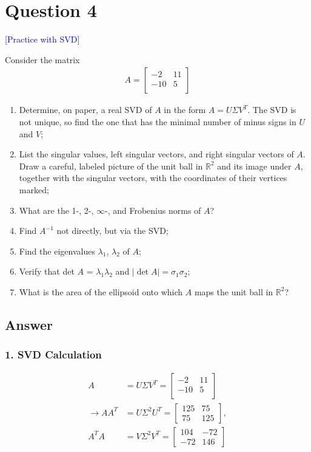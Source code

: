 \section*{Question 4}
\textcolor{blue}{[Practice with SVD]}


Consider the matrix
\begin{align*}
A = \begin{bmatrix}
-2 & 11\\
-10 & 5\\
\end{bmatrix}    
\end{align*}


\begin{enumerate}
    \item Determine, on paper, a real SVD of $A$ in the form $A = U \Sigma V^T$. The SVD is not unique, so find the one that has the minimal number of minus signs in $U$ and $V$;
    \item List the singular values, left singular vectors, and right singular vectors of $A$. 
    Draw a careful, labeled picture of the unit ball in $\mathbb{R}^2$ and its image under $A$, 
    together with the singular vectors, 
    with the coordinates of their vertices marked;
    \item What are the 1-, 2-, $\infty$-, and Frobenius norms of $A$?
    \item Find $A^{-1}$ not directly, but via the SVD;
    \item Find the eigenvalues $\lambda_1$,  $\lambda_2$ of $A$;
    \item Verify that det $A$ = $\lambda_1\lambda_2$ and $|\det A|=\sigma_1\sigma_2$;
    \item What is the area of the ellipsoid onto which $A$ maps the unit ball in $\mathbb{R}^2$?
\end{enumerate}



\subsection*{Answer}
\subsubsection*{1. SVD Calculation}
\begin{align*}
A &= U \Sigma V^T = \begin{bmatrix}
-2 & 11\\
-10 & 5\\
\end{bmatrix} \\  
\xrightarrow{} 
AA^T &= U \Sigma^2 U^T = \begin{bmatrix}
125 & 75\\
75 & 125
\end{bmatrix} ,\\
A^TA &= V \Sigma^2 V^T = \begin{bmatrix}
    104 & -72\\
    -72 & 146
    \end{bmatrix}
\end{align*}

